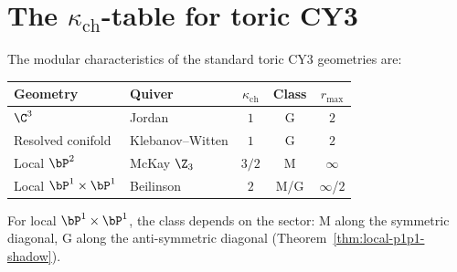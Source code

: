 \section{The \texorpdfstring{$\kappa_{\mathrm{ch}}$}{kappa-ch}-table for toric CY3}
\label{sec:toric-kappa-table}

\begin{proposition}
\label{prop:toric-kappa-table}
The modular characteristics of the standard toric CY3 geometries are:
\begin{center}
\begin{tabular}{llccc}
\toprule
Geometry & Quiver & $\kappa_{\mathrm{ch}}$ & Class & $r_{\max}$ \\
\midrule
$\C^3$ & Jordan & $1$ & G & $2$ \\
Resolved conifold & Klebanov--Witten & $1$ & G & $2$ \\
Local $\bP^2$ & McKay $\Z_3$ & $3/2$ & M & $\infty$ \\
Local $\bP^1 \times \bP^1$ & Beilinson & $2$ & M/G & $\infty$/$2$ \\
\bottomrule
\end{tabular}
\end{center}
For local $\bP^1 \times \bP^1$, the class depends on the sector: M along the symmetric diagonal, G along the anti-symmetric diagonal (Theorem~\ref{thm:local-p1p1-shadow}).
\end{proposition}

